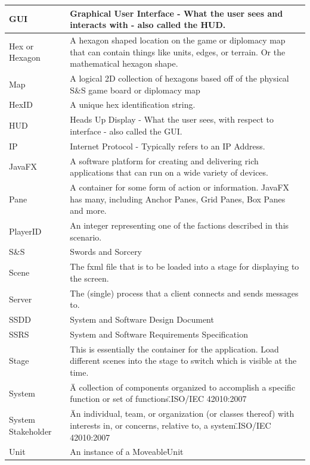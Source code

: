 \documentclass[12pt,a4paper,titlepage]{article}
\begin{document}
{\begin{center}
\begin{tabularx}{\linewidth}{|p{1.5in}|X|}
\hline
GUI & Graphical User Interface - What the user sees and interacts with - also called the HUD.\\
\hline
Hex or Hexagon & A hexagon shaped location on the game or diplomacy map that can contain things like units, edges, or terrain. Or the mathematical hexagon shape.\\
\hline
Map & A logical 2D collection of hexagons based off of the physical S\&S game board or diplomacy map\\
\hline
HexID & A unique hex identification string.\\
\hline
HUD & Heads Up Display - What the user sees, with respect to interface - also called the GUI.\\
\hline
IP & Internet Protocol - Typically refers to an IP Address.\\
\hline
JavaFX & A software platform for creating and delivering rich applications that can run on a wide variety of devices.\\
\hline
Pane & A container for some form of action or information.  JavaFX has many, including Anchor Panes, Grid Panes, Box Panes and more.\\
\hline
PlayerID & An integer representing one of the factions described in this scenario.\\
\hline
S\&S & Swords and Sorcery\\
\hline
Scene & The fxml file that is to be loaded into a stage for displaying to the screen.\\
\hline
Server & The (single) process that a client connects and sends messages to. \\
\hline
SSDD & System and Software Design Document\\
\hline
SSRS & System and Software Requirements Specification\\
\hline
Stage & This is essentially the container for the application.  Load different scenes into the stage to switch which is visible at the time.\\
\hline
System & \"A collection of components organized to accomplish a specific function or set of functions.\"\space ISO/IEC 42010:2007\\
\hline
System Stakeholder & \"An individual, team, or organization (or classes thereof) with interests in, or concerns, relative to, a system.\"\space ISO/IEC 42010:2007\\
\hline
Unit & An instance of a MoveableUnit\\
\hline
\end{tabularx}
\end{center}
}
\end{document}
